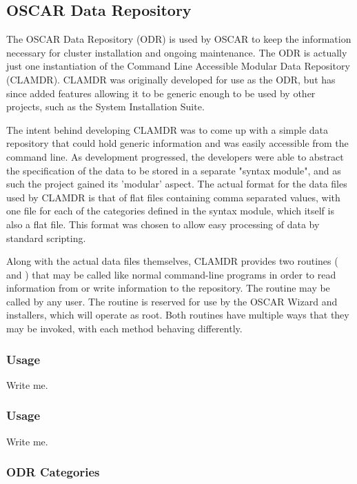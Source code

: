 \subsection{OSCAR Data Repository}

The OSCAR Data Repository (ODR) is used by OSCAR to keep the
information necessary for cluster installation and ongoing
maintenance. The ODR is actually just one instantiation of the Command
Line Accessible Modular Data Repository (CLAMDR). CLAMDR was
originally developed for use as the ODR, but has since added features
allowing it to be generic enough to be used by other projects, such as
the System Installation Suite.

The intent behind developing CLAMDR was to come up with a simple data
repository that could hold generic information and was easily
accessible from the command line. As development progressed, the
developers were able to abstract the specification of the data to be
stored in a separate "syntax module", and as such the project gained
its 'modular' aspect. The actual format for the data files used by
CLAMDR is that of flat files containing comma separated values, with
one file for each of the categories defined in the syntax module,
which itself is also a flat file.  This format was chosen to allow
easy processing of data by standard scripting.

Along with the actual data files themselves, CLAMDR provides two
routines ( and ) that may be called
like normal command-line programs in order to read information from or
write information to the repository. The  routine may
be called by any user. The  routine is reserved for
use by the OSCAR Wizard and installers, which will operate as root.
Both routines have multiple ways that they may be invoked, with each
method behaving differently.

\subsubsection{ Usage}

Write me.

\subsubsection{ Usage}

Write me.

\subsubsection{ODR Categories}

